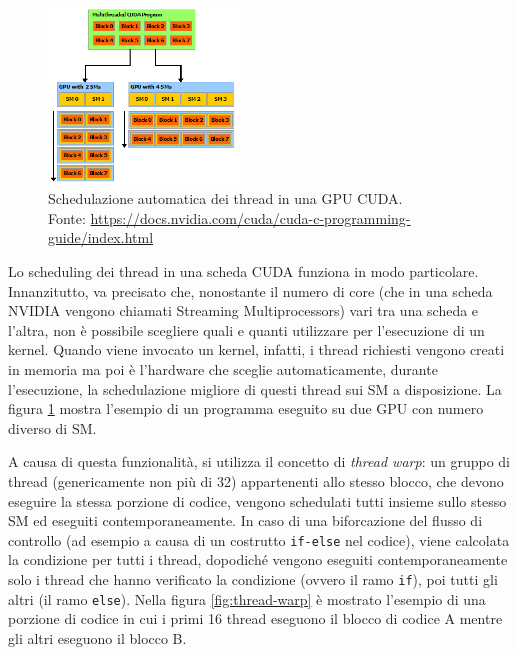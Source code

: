 \documentclass[12pt,a4paper,oneside]{book}
\begin{document}
	\begin{figure}
		\centering
		\includegraphics[width=0.45\textwidth]{automatic-scalability}
		\caption[Schedulazione automatica dei thread in una GPU CUDA]{Schedulazione automatica dei thread in una GPU CUDA.\\Fonte: \url{https://docs.nvidia.com/cuda/cuda-c-programming-guide/index.html}}
		\label{fig:automatic-scalability}
	\end{figure}
	
	Lo scheduling dei thread in una scheda CUDA funziona in modo particolare. Innanzitutto, va precisato che, nonostante il numero di core (che in una scheda NVIDIA vengono chiamati Streaming Multiprocessors) vari tra una scheda e l'altra, non è possibile scegliere quali e quanti utilizzare per l'esecuzione di un kernel. Quando viene invocato un kernel, infatti, i thread richiesti vengono creati in memoria ma poi è l'hardware che sceglie automaticamente, durante l'esecuzione, la schedulazione migliore di questi thread sui SM a disposizione. La figura \ref{fig:automatic-scalability} mostra l'esempio di un programma eseguito su due GPU con numero diverso di SM.

	A causa di questa funzionalità, si utilizza il concetto di \textit{thread warp}: un gruppo di thread (genericamente non più di 32) appartenenti allo stesso blocco, che devono eseguire la stessa porzione di codice, vengono schedulati tutti insieme sullo stesso SM ed eseguiti contemporaneamente. In caso di una biforcazione del flusso di controllo (ad esempio a causa di un costrutto \texttt{if-else} nel codice), viene calcolata la condizione per tutti i thread, dopodiché vengono eseguiti contemporaneamente solo i thread che hanno verificato la condizione (ovvero il ramo \texttt{if}), poi tutti gli altri (il ramo \texttt{else}). Nella figura \ref{fig:thread-warp} è mostrato l'esempio di una porzione di codice in cui i primi 16 thread eseguono il blocco di codice A mentre gli altri eseguono il blocco B.
	
\end{document}
